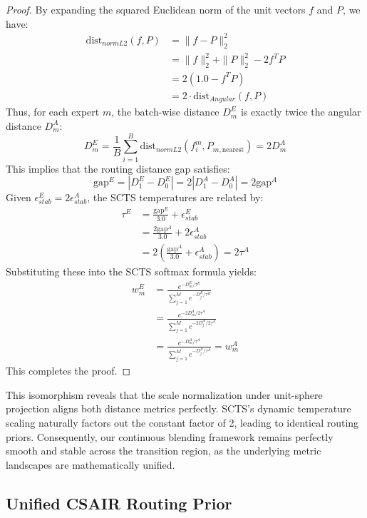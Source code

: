 \documentclass{article}
\theoremstyle{plain}
\theoremstyle{definition}
\theoremstyle{remark}
\begin{document}
\begin{proof}
By expanding the squared Euclidean norm of the unit vectors $f$ and $P$, we have:
\begin{align*}
\text{dist}_{normL2}(f, P) &= \|f - P\|_2^2 \\
&= \|f\|_2^2 + \|P\|_2^2 - 2 f^T P \\
&= 2(1.0 - f^T P) \\
&= 2 \cdot \text{dist}_{Angular}(f, P)
\end{align*}
Thus, for each expert $m$, the batch-wise distance $D_m^E$ is exactly twice the angular distance $D_m^A$:
\begin{equation}
D_m^E = \frac{1}{B} \sum_{i=1}^B \text{dist}_{normL2}(f^m_i, P_{m, \text{nearest}}) = 2 D_m^A
\end{equation}
This implies that the routing distance gap satisfies:
\begin{equation}
\text{gap}^E = |D_1^E - D_0^E| = 2 |D_1^A - D_0^A| = 2 \text{gap}^A
\end{equation}
Given $\epsilon_{stab}^E = 2 \epsilon_{stab}^A$, the SCTS temperatures are related by:
\begin{align*}
\tau^E &= \frac{\text{gap}^E}{3.0} + \epsilon_{stab}^E \\
&= \frac{2\text{gap}^A}{3.0} + 2\epsilon_{stab}^A \\
&= 2 \left( \frac{\text{gap}^A}{3.0} + \epsilon_{stab}^A \right) = 2 \tau^A
\end{align*}
Substituting these into the SCTS softmax formula yields:
\begin{align*}
w_m^E &= \frac{e^{-D_m^E / \tau^E}}{\sum_{j=1}^M e^{-D_j^E / \tau^E}} \\
&= \frac{e^{-2D_m^A / 2\tau^A}}{\sum_{j=1}^M e^{-2D_j^A / 2\tau^A}} \\
&= \frac{e^{-D_m^A / \tau^A}}{\sum_{j=1}^M e^{-D_j^A / \tau^A}} = w_m^A
\end{align*}
This completes the proof.
\end{proof}

This isomorphism reveals that the scale normalization under unit-sphere projection aligns both distance metrics perfectly. SCTS's dynamic temperature scaling naturally factors out the constant factor of 2, leading to identical routing priors. Consequently, our continuous blending framework remains perfectly smooth and stable across the transition region, as the underlying metric landscapes are mathematically unified.

\subsection{Unified CSAIR Routing Prior}
\end{document}
